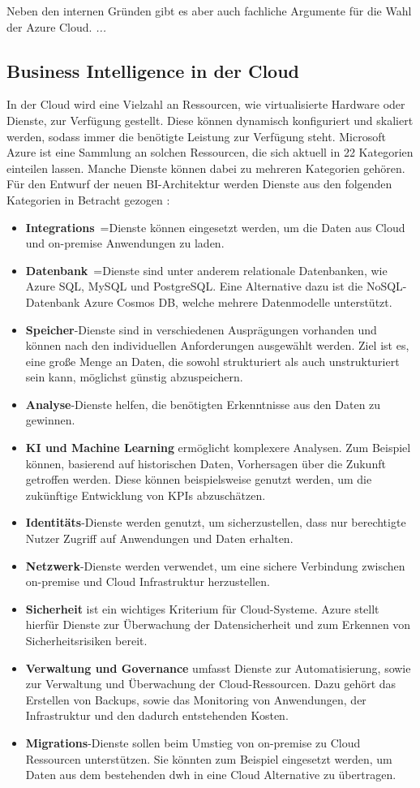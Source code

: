 Neben den internen Gründen gibt es aber auch fachliche Argumente für die Wahl der Azure Cloud.
\textit{...}

\subsection{Business Intelligence in der Cloud} \label{subsec:grundlagen:azure:bi}
In der Cloud wird eine Vielzahl an Ressourcen, wie virtualisierte Hardware oder Dienste, zur Verfügung gestellt. Diese können dynamisch konfiguriert und skaliert werden, sodass immer die benötigte Leistung zur Verfügung steht. Microsoft Azure ist eine Sammlung an solchen Ressourcen, die sich aktuell in 22 Kategorien einteilen lassen. Manche Dienste können dabei zu mehreren Kategorien gehören. Für den Entwurf der neuen BI-Architektur werden Dienste aus den folgenden Kategorien in Betracht gezogen \cite{chilberto_building_2020}:
\begin{itemize}
\item \textbf{Integrations}~=Dienste können eingesetzt werden, um die Daten aus Cloud und on-premise Anwendungen zu laden.
\item \textbf{Datenbank}~=Dienste sind unter anderem relationale Datenbanken, wie Azure SQL, MySQL und PostgreSQL. Eine Alternative dazu ist die NoSQL-Datenbank Azure Cosmos DB, welche mehrere Datenmodelle unterstützt.
\item \textbf{Speicher}-Dienste sind in verschiedenen Ausprägungen vorhanden und können nach den individuellen Anforderungen ausgewählt werden. Ziel ist es, eine große Menge an Daten, die sowohl strukturiert als auch unstrukturiert sein kann, möglichst günstig abzuspeichern.
\item \textbf{Analyse}-Dienste helfen, die benötigten Erkenntnisse aus den Daten zu gewinnen.
\item \textbf{KI und Machine Learning} ermöglicht komplexere Analysen. Zum Beispiel können, basierend auf historischen Daten, Vorhersagen über die Zukunft getroffen werden. Diese können beispielsweise genutzt werden, um die zukünftige Entwicklung von KPIs abzuschätzen.
\item \textbf{Identitäts}-Dienste werden genutzt, um sicherzustellen, dass nur berechtigte Nutzer Zugriff auf Anwendungen und Daten erhalten.
\item \textbf{Netzwerk}-Dienste werden verwendet, um eine sichere Verbindung zwischen on-premise und Cloud Infrastruktur herzustellen.
\item \textbf{Sicherheit} ist ein wichtiges Kriterium für Cloud-Systeme. Azure stellt hierfür Dienste zur Überwachung der Datensicherheit und zum Erkennen von Sicherheitsrisiken bereit.
\item \textbf{Verwaltung und Governance} umfasst Dienste zur Automatisierung, sowie zur Verwaltung und Überwachung der Cloud-Ressourcen. Dazu gehört das Erstellen von Backups, sowie das Monitoring von Anwendungen, der Infrastruktur und den dadurch entstehenden Kosten.
\item \textbf{Migrations}-Dienste sollen beim Umstieg von on-premise zu Cloud Ressourcen unterstützen. Sie könnten zum Beispiel eingesetzt werden, um Daten aus dem bestehenden \ac{dwh} in eine Cloud Alternative zu übertragen.
\end{itemize}
